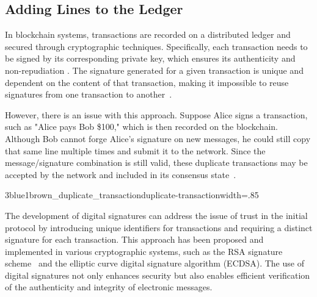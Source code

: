 \subsection{Adding Lines to the Ledger}
In blockchain systems, transactions are recorded on a distributed ledger and secured through cryptographic techniques. Specifically, each
transaction needs to be signed by its corresponding private key, which ensures its authenticity and non-repudiation
\cite{stinson2018cryptography}. The signature generated for a given transaction is unique and dependent on the content of that transaction,
making it impossible to reuse signatures from one transaction to another~\cite{bruce1996applied}.

However, there is an issue with this approach. Suppose Alice signs a transaction, such as "Alice pays Bob \$100," which is then recorded on
the blockchain. Although Bob cannot forge Alice's signature on new messages, he could still copy that same line multiple times and submit it
to the network. Since the message/signature combination is still valid, these duplicate transactions may be accepted by the network and
included in its consensus state~\cite{swan2015blockchain}.

{3blue1brown_duplicate_transaction}{duplicate-transaction}{width=.85\textwidth}%

The development of digital signatures can address the issue of trust in the initial protocol by introducing unique identifiers for transactions
and requiring a distinct signature for each transaction. This approach has been proposed and implemented in various cryptographic systems,
such as the RSA signature scheme~\cite{rivest1978method} and the elliptic curve digital signature algorithm (ECDSA). The use of digital
signatures not only enhances security but also enables efficient verification of the authenticity and integrity of electronic messages.
